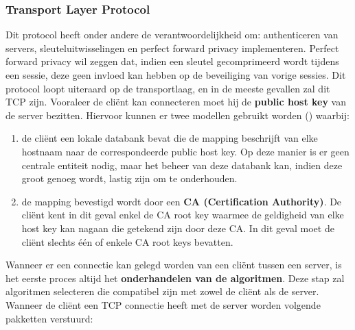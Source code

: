 \documentclass{report}
\begin{document}
	\subsubsection{Transport Layer Protocol}
	Dit protocol heeft onder andere de verantwoordelijkheid om: authenticeren van servers, sleuteluitwisselingen en perfect forward privacy implementeren. Perfect forward privacy wil zeggen dat, indien een sleutel gecomprimeerd wordt tijdens een sessie, deze geen invloed kan hebben op de beveiliging van vorige sessies. Dit protocol loopt uiteraard op de transportlaag, en in de meeste gevallen zal dit TCP zijn. Vooraleer de cliënt kan connecteren moet hij de \textbf{public host key} van de server bezitten. Hiervoor kunnen er twee modellen gebruikt worden () waarbij: 
	\begin{enumerate}
		\item de cliënt een lokale databank bevat die de mapping beschrijft van elke hostnaam naar de correspondeerde public host key. Op deze manier is er geen centrale entiteit nodig, maar het beheer van deze databank kan, indien deze groot genoeg wordt, lastig zijn om te onderhouden.
		\item de mapping bevestigd wordt door een \textbf{CA (Certification Authority)}. De cliënt kent in dit geval enkel de CA root key waarmee de geldigheid van elke host key kan nagaan die getekend zijn door deze CA. In dit geval moet de cliënt slechts één of enkele CA root keys bevatten. 
	\end{enumerate}
	Wanneer er een connectie kan gelegd worden van een cliënt tussen een server, is het eerste proces altijd het \textbf{onderhandelen van de algoritmen}. Deze stap zal algoritmen selecteren die compatibel zijn met zowel de cliënt als de server. Wanneer de cliënt een TCP connectie heeft met de server worden volgende pakketten verstuurd:
\end{document}
